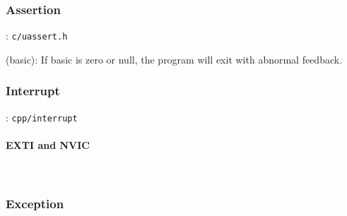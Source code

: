 \subsubsection{Assertion}
: \verb`c/uassert.h`

(basic): If basic is zero or null, the program will exit with abnormal feedback.

\subsubsection{Interrupt}
: \verb`cpp/interrupt`


\paragraph{EXTI and NVIC} \

\subsubsection{Exception}

